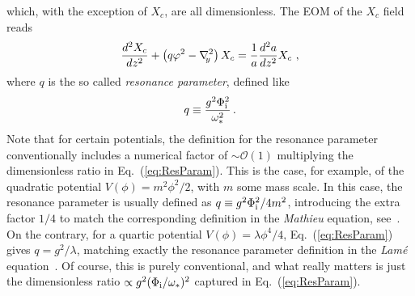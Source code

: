\documentclass[a4paper,11pt]{article}
\newcommand{\be}{\begin{equation}}
\newcommand{\ee}{\end{equation}}
\begin{document}
which, with the exception of $X_c$, are all dimensionless. The EOM of the $X_c$ field reads
\be
{d^2 X_c \over dz^2} + \left(q \varphi^2 - \nabla_{\hspace*{-1mm}y}^2\right) X_c = {1\over a}{d^2a\over dz^2}X_c \label{eq:conformal-eom} \ ,\ee
where $q$ is the so called {\it resonance parameter}, defined like
\be\label{eq:ResParam}
q \equiv {g^2\Phi_{\rm i}^2\over \omega_{*}^2}\,.
\ee
Note that for certain potentials, the definition for the resonance parameter conventionally includes a numerical factor of $\sim \mathcal{O}(1)$ multiplying the dimensionless ratio in Eq.~(\ref{eq:ResParam}). This is the case, for example, of the quadratic potential $V(\phi) = m^2\phi^2/2$, with $m$ some mass scale. In this case, the resonance parameter is usually defined as $q \equiv {g^2\Phi_{\rm i}^2/4m^2}$, introducing the extra factor ${1/4}$ to match the corresponding definition in the {\it Mathieu} equation, see~\cite{Kofman:1997yn}. On the contrary, for a quartic potential $V(\phi) = \lambda\phi^4/4$, Eq.~(\ref{eq:ResParam}) gives $q = {g^2/\lambda}$, matching exactly the resonance parameter definition in the {\it Lam\'e} equation~\cite{Greene:1997fu}. Of course, this is purely conventional, and what really matters is just the dimensionless ratio $\propto {g^2(\Phi_{\rm i}/\omega_{*})^2}$ captured in Eq.~(\ref{eq:ResParam}).
\end{document}
